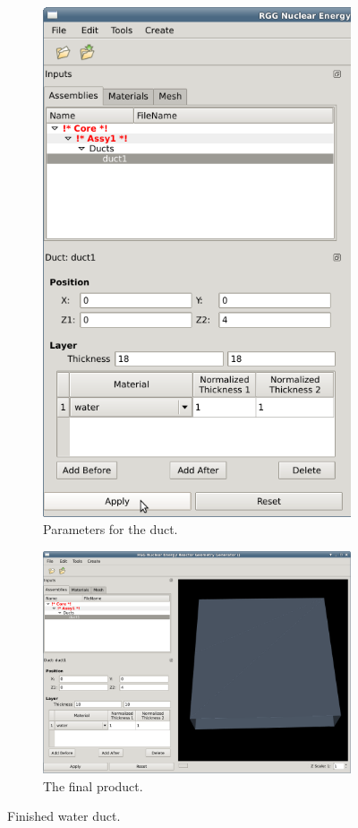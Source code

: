 \begin{figure}
\centering
\begin{subfigure}{.5\textwidth}
  \centering
  \includegraphics[width=0.7\linewidth]{Images/rect-3e1.png}
  \caption{Parameters for the duct.}
  \label{fig:Rect3}
\end{subfigure}%
\begin{subfigure}{.5\textwidth}
  \centering
  \includegraphics[width=0.9\linewidth]{Images/rect-4.png}
  \caption{The final product.}
  \label{fig:Rect4}
\end{subfigure}
\caption{Finished water duct.}
\label{fig:test}
\end{figure}

